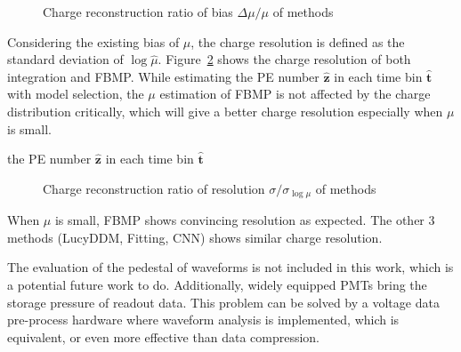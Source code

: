 \begin{figure}[H]
    \centering
    \resizebox{\textwidth}{!}{}
    \caption{\label{fig:biasmu} Charge reconstruction ratio of bias $\Delta\mu/\mu$ of methods}
\end{figure}

Considering the existing bias of $\mu$, the charge resolution is defined as the standard deviation of $\log{\hat{\mu}}$. Figure~\ref{fig:deltamu} shows the charge resolution of both integration and FBMP. While estimating the PE number $\hat{\bm{z}}$ in each time bin $\hat{\bm{t}}$ with model selection, the $\mu$ estimation of FBMP is not affected by the charge distribution critically, which will give a better charge resolution especially when $\mu$ is small. 

the PE number $\hat{\bm{z}}$ in each time bin $\hat{\bm{t}}$

\begin{figure}[H]
    \centering
    \resizebox{\textwidth}{!}{}
    \caption{\label{fig:deltamu} Charge reconstruction ratio of resolution $\sigma/\sigma_{\log\mu}$ of methods}
\end{figure}

When $\mu$ is small, FBMP shows convincing resolution as expected. The other 3 methods (LucyDDM, Fitting, CNN) shows similar charge resolution. 


The evaluation of the pedestal of waveforms is not included in this work, which is a potential future work to do. Additionally, widely equipped PMTs bring the storage pressure of readout data. This problem can be solved by a voltage data pre-process hardware where waveform analysis is implemented, which is equivalent, or even more effective than data compression. 

